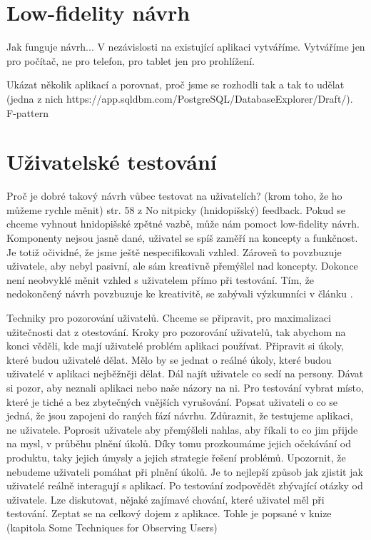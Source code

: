 \section{Low-fidelity návrh}

Jak funguje návrh... V nezávislosti na existující aplikaci vytváříme.
Vytváříme jen pro počítač, ne pro telefon, pro tablet jen pro prohlížení.

Ukázat několik aplikací a porovnat, proč jsme se rozhodli tak a tak to udělat (jedna z nich https://app.sqldbm.com/PostgreSQL/DatabaseExplorer/Draft/). F-pattern

\section{Uživatelské testování}


Proč je dobré takový návrh vůbec testovat na uživatelích? (krom toho, že ho můžeme rychle měnit) str. 58 z \cite{Paper_Prototyping} No nitpicky (hnidopišský) feedback. Pokud se chceme vyhnout hnidopišské zpětné vazbě, může nám pomoct low-fidelity návrh. Komponenty nejsou jasně dané, uživatel se spíš zaměří na koncepty a funkčnost. Je totiž očividné, že jsme ještě nespecifikovali vzhled. Zároveň to povzbuzuje uživatele, aby nebyl pasivní, ale sám kreativně přemýšlel nad koncepty. Dokonce není neobvyklé měnit vzhled s uživatelem přímo při testování. Tím, že nedokončený návrh povzbuzuje ke kreativitě, se zabývali výzkumníci v článku \cite{Schumann_1996_AEN}.

Techniky pro pozorování uživatelů. Chceme se připravit, pro maximalizaci užitečnosti dat z otestování. Kroky pro pozorování uživatelů, tak abychom na konci věděli, kde mají uživatelé problém aplikaci používat. 
Připravit si úkoly, které budou uživatelé dělat. Mělo by se jednat o reálné úkoly, které budou uživatelé v aplikaci nejběžněji dělat. 
Dál najít uživatele co sedí na persony. Dávat si pozor, aby neznali aplikaci nebo naše názory na ni.
Pro testování vybrat místo, které je tiché a bez zbytečných vnějších vyrušování.
Popsat uživateli o co se jedná, že jsou zapojeni do raných fází návrhu. Zdůraznit, že testujeme aplikaci, ne uživatele.
Poprosit uživatele aby přemýšleli nahlas, aby říkali to co jim přijde na mysl, v průběhu plnění úkolů. Díky tomu prozkoumáme jejich očekávání od produktu, taky jejich úmysly a jejich strategie řešení problémů.
Upozornit, že nebudeme uživateli pomáhat při plnění úkolů. Je to nejlepší způsob jak zjistit jak uživatelé reálně interagují s aplikací. 
Po testování zodpovědět zbývající otázky od uživatele. Lze diskutovat, nějaké zajímavé chování, které uživatel měl při testování. Zeptat se na celkový dojem z aplikace. Tohle je popsané v knize \cite{Brenda_1990_art} (kapitola Some Techniques for Observing Users)


